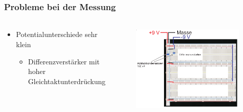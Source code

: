 \begin{frame}
    \frametitle{Probleme bei der Messung}
    \framesubtitle{}
    \begin{columns}[c]
    \begin{block}{}
        \begin{itemize}
            \item Potentialunterschiede sehr klein
            \pause
            \begin{itemize}
                \item Differenzverstärker mit hoher
                Gleichtaktunterdrückung
            \end{itemize}
        \end{itemize}
    \end{block}
    \begin{figure}[H]
    \begin{center}
            \includegraphics[scale=0.22]{./img/schaltung/gesamt_0.png}
    \end{center}
    \end{figure}
    \end{columns}
\end{frame}

